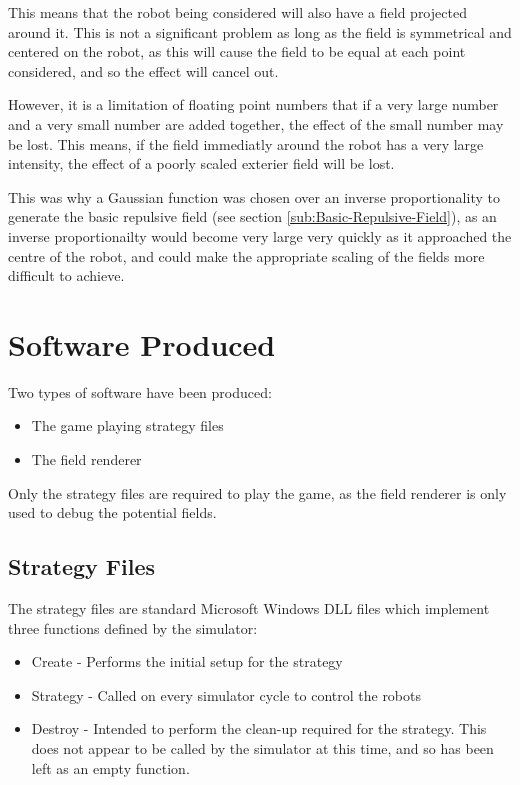 \documentclass[10pt]{article}
\begin{document}
This means that the robot being considered will also have a field projected
around it.  This is not a significant problem as long as the field is
symmetrical and centered on the robot, as this will cause the field to be equal
at each point considered, and so the effect will cancel out.

However, it is a limitation of floating point numbers that if a very large
number and a very small number are added together, the effect of the small
number may be lost.  This means, if the field immediatly around the robot has a
very large intensity, the effect of a poorly scaled exterier field will be lost.

This was why a Gaussian function was chosen over an inverse proportionality to
generate the basic repulsive field (see section
\ref{sub:Basic-Repulsive-Field}), as an inverse proportionailty would become
very large very quickly as it approached the centre of the robot, and could make
the appropriate scaling of the fields more difficult to achieve.

\section{Software Produced}

Two types of software have been produced:
\begin{itemize}
\item The game playing strategy files
\item The field renderer
\end{itemize}

Only the strategy files are required to play the game, as the field renderer is
only used to debug the potential fields.

\subsection{Strategy Files}

The strategy files are standard Microsoft Windows \ac{DLL} files which
implement three functions defined by the simulator:
\begin{itemize}
\item Create - Performs the initial setup for the strategy
\item Strategy - Called on every simulator cycle to control the robots
\item Destroy - Intended to perform the clean-up required for the strategy.
This does not appear to be called by the simulator at this time, and so has been
 left as an empty function.
\end{itemize}
\end{document}
